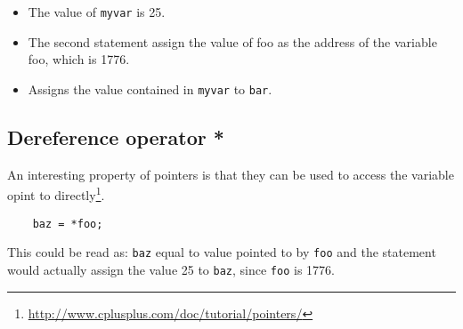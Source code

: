 \documentclass[12pt]{article}
\begin{document}
	\begin{itemize}
	\item The value of \verb|myvar| is 25. 
	\item  The second statement assign the value of foo as the address of the variable foo, which is 1776. 
	\item Assigns the value contained in \verb|myvar| to \verb|bar|. 
	\end{itemize}

	\subsection{Dereference operator *}

	An interesting property of pointers is that they can be used to access the variable opint to directly\footnote{\url{http://www.cplusplus.com/doc/tutorial/pointers/}}. 

	\begin{verbatim}
	baz = *foo; 
	\end{verbatim}

	This could be read as: \verb|baz| equal to value pointed to by \verb|foo| and the statement would actually assign the value 25 to \verb|baz|, since \verb|foo| is 1776. 


\end{document}
